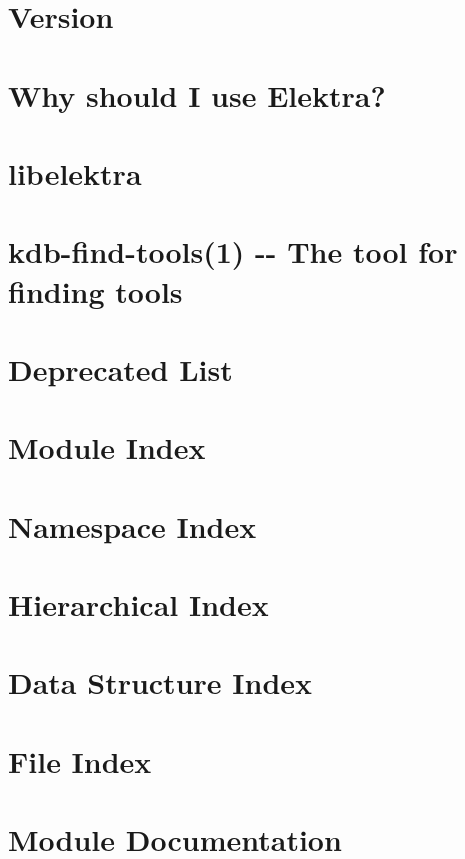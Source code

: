 \documentclass[twoside]{book}
\newcommand{\+}{\discretionary{\mbox{\scriptsize$\hookleftarrow$}}{}{}}
\begin{document}
\chapter{Version}
\label{doc_VERSION_md}
\hypertarget{doc_VERSION_md}{}

\chapter{Why should I use Elektra?}
\label{doc_WHY_md}
\hypertarget{doc_WHY_md}{}

\chapter{libelektra}
\label{README_md}
\hypertarget{README_md}{}

\chapter{kdb-\/find-\/tools(1) -\/-\/ The tool for finding tools}
\label{md_scripts_README}
\hypertarget{md_scripts_README}{}

\chapter{Deprecated List}
\label{deprecated}
\hypertarget{deprecated}{}

\chapter{Module Index}

\chapter{Namespace Index}

\chapter{Hierarchical Index}

\chapter{Data Structure Index}

\chapter{File Index}

\chapter{Module Documentation}











\end{document}

